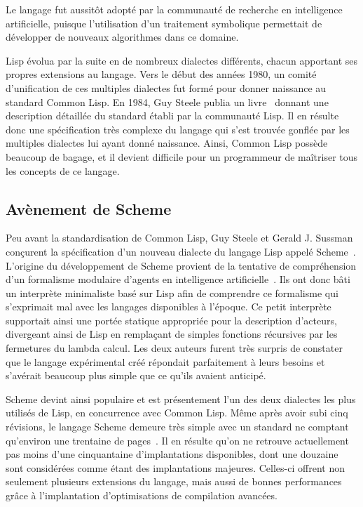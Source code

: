 \documentclass[12pt,twoside,letterpaper,francais]{book}
\begin{document}
Le langage fut aussitôt adopté par la communauté de recherche en
intelligence artificielle, puisque l'utilisation d'un traitement
symbolique permettait de développer de nouveaux algorithmes dans ce
domaine.

Lisp évolua par la suite en de nombreux dialectes différents, chacun
apportant ses propres extensions au langage. Vers le début des années
1980, un comité d'unification de ces multiples dialectes fut formé
pour donner naissance au standard Common Lisp. En 1984, Guy Steele
publia un livre~\cite{CLISP} donnant une description détaillée du
standard établi par la communauté Lisp. Il en résulte donc une
spécification très complexe du langage qui s'est trouvée gonflée par
les multiples dialectes lui ayant donné naissance. Ainsi, Common Lisp
possède beaucoup de bagage, et il devient difficile pour un
programmeur de maîtriser tous les concepts de ce langage.


\FloatBarrier
\subsection{Avènement de Scheme}
Peu avant la standardisation de Common Lisp, Guy Steele et Gerald
J. Sussman conçurent la spécification d'un nouveau dialecte du langage
Lisp appelé Scheme~\cite{SCHEME_ORIGINS}. L'origine du dévelop\-pement
de Scheme provient de la tentative de compréhension d'un formalisme
modulaire d'agents en intelligence
artificielle~\cite{ACTOR,Scheme-History}. Ils ont donc bâti un
interprète minimaliste basé sur Lisp afin de comprendre ce formalisme
qui s'exprimait mal avec les langages disponibles à l'époque. Ce petit
interprète supportait ainsi une portée statique appropriée pour la
description d'acteurs, divergeant ainsi de Lisp en remplaçant de
simples fonctions récursives par les fermetures du lambda calcul. Les
deux auteurs furent très surpris de constater que le langage
expérimental créé répondait parfaitement à leurs besoins et s'avérait
beaucoup plus simple que ce qu'ils avaient anticipé.

Scheme devint ainsi populaire et est présentement l'un des deux
dialectes les plus utilisés de Lisp, en concurrence avec Common Lisp. Même
après avoir subi cinq révisions, le langage Scheme demeure très
simple avec un standard ne comptant qu'environ une trentaine de
pages~\cite{R5RS}. Il en résulte qu'on ne retrouve actuellement pas
moins d'une cinquantaine d'implantations disponibles, dont une
douzaine sont considérées comme étant des implantations
majeures. Celles-ci offrent non seulement plusieurs extensions du
langage, mais aussi de bonnes performances grâce à l'implantation
d'optimisations de compilation avancées.
\end{document}
